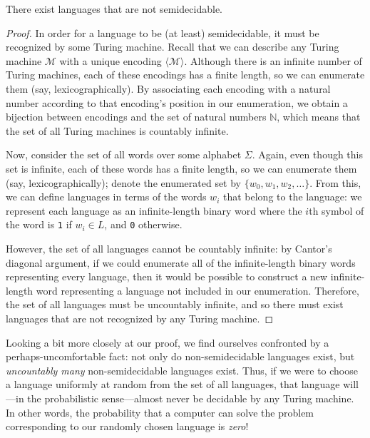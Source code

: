 \begin{theorem}\label{thm:nonsemidecidablelanguages}
There exist languages that are not semidecidable.

\begin{proof}
In order for a language to be (at least) semidecidable, it must be recognized by some Turing machine. Recall that we can describe any Turing machine $\mathcal{M}$ with a unique encoding $\langle \mathcal{M} \rangle$. Although there is an infinite number of Turing machines, each of these encodings has a finite length, so we can enumerate them (say, lexicographically). By associating each encoding with a natural number according to that encoding's position in our enumeration, we obtain a bijection between encodings and the set of natural numbers $\mathbb{N}$, which means that the set of all Turing machines is countably infinite.

Now, consider the set of all words over some alphabet $\Sigma$. Again, even though this set is infinite, each of these words has a finite length, so we can enumerate them (say, lexicographically); denote the enumerated set by $\{w_{0}, w_{1}, w_{2}, \dots\}$. From this, we can define languages in terms of the words $w_{i}$ that belong to the language: we represent each language as an infinite-length binary word where the $i$th symbol of the word is \texttt{1} if $w_{i} \in L$, and \texttt{0} otherwise.

However, the set of all languages cannot be countably infinite: by Cantor's diagonal argument, if we could enumerate all of the infinite-length binary words representing every language, then it would be possible to construct a new infinite-length word representing a language not included in our enumeration. Therefore, the set of all languages must be uncountably infinite, and so there must exist languages that are not recognized by any Turing machine.
\end{proof}
\end{theorem}

Looking a bit more closely at our proof, we find ourselves confronted by a perhaps-uncomfortable fact: not only do non-semidecidable languages exist, but \emph{uncountably many} non-semidecidable languages exist. Thus, if we were to choose a language uniformly at random from the set of all languages, that language will---in the probabilistic sense---almost never be decidable by any Turing machine. In other words, the probability that a computer can solve the problem corresponding to our randomly chosen language is \emph{zero}!

